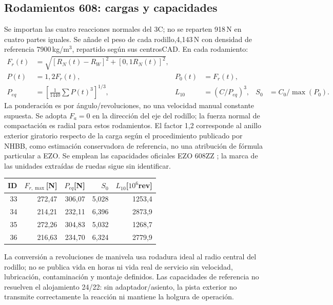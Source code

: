 \subsection{Rodamientos 608: cargas y capacidades}
Se importan las cuatro reacciones normales del 3C; no se reparten 918\,N en
cuatro partes iguales. Se añade el peso de cada rodillo,4,143\,N con densidad
de referencia 7900\,kg/m$^3$, repartido según sus centrosCAD. En cada rodamiento:
\begin{align}
 F_r(t)&=\sqrt{[R_N(t)-R_W]^2+[0,1R_N(t)]^2},\\
 P(t)&=1,2F_r(t),&P_0(t)&=F_r(t),\\
 P_{eq}&=\left[\frac 1{1440}\sum P(t)^3\right]^{1/3},&
 L_{10}&=(C/P_{eq})^3,&S_0&=C_0/\max(P_0).
\end{align}
La ponderación es por ángulo/revoluciones, no una velocidad manual
constante supuesta. Se adopta $F_a=0$ en la dirección del eje del rodillo;
la fuerza normal de compactación es radial para estos rodamientos.
El factor 1,2 corresponde al anillo exterior giratorio respecto de la carga
según el procedimiento publicado por NHBB\cite{nhbb_vida_exterior_2026},
como estimación conservadora de referencia, no una atribución de fórmula
particular a EZO. Se emplean las capacidades oficiales EZO 608ZZ
\cite{ezo_608zz_2026}; la marca de las unidades extraídas de ruedas sigue
sin identificar.
\begin{center}\begin{tabular}{rrrrr}\toprule
ID&$F_{r,\max}$[N]&$P_{eq}$[N]&$S_0$&$L_{10}$[$10^6$rev]\\\midrule
33 & 272,47 & 306,07 & 5,028 & 1253,4 \\
34 & 214,21 & 232,11 & 6,396 & 2873,9 \\
35 & 272,26 & 304,83 & 5,032 & 1268,7 \\
36 & 216,63 & 234,70 & 6,324 & 2779,9 \\
\bottomrule\end{tabular}\end{center}
La conversión a revoluciones de manivela usa rodadura ideal al radio
central del rodillo; no se publica vida en horas ni vida real de servicio
sin velocidad, lubricación, contaminación y montaje definidos.
Las capacidades de referencia no resuelven el alojamiento 24/22:
sin adaptador/asiento, la pista exterior no transmite correctamente
la reacción ni mantiene la holgura de operación.

